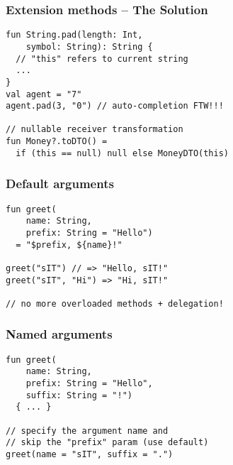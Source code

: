 \begin{frame}[fragile] \frametitle{Extension methods -- The Solution}
\begin{lstlisting}
fun String.pad(length: Int,
    symbol: String): String {
  // "this" refers to current string
  ...
}
val agent = "7"
agent.pad(3, "0") // auto-completion FTW!!!

// nullable receiver transformation
fun Money?.toDTO() =
  if (this == null) null else MoneyDTO(this)
\end{lstlisting}
\end{frame}



\begin{frame}[fragile] \frametitle{Default arguments}
\begin{lstlisting}
fun greet(
    name: String,
    prefix: String = "Hello")
  = "$prefix, ${name}!"

greet("sIT") // => "Hello, sIT!"
greet("sIT", "Hi") => "Hi, sIT!"

// no more overloaded methods + delegation!
\end{lstlisting}
\end{frame}


\begin{frame}[fragile] \frametitle{Named arguments}
\begin{lstlisting}
fun greet(
    name: String,
    prefix: String = "Hello",
    suffix: String = "!")
  { ... }

// specify the argument name and
// skip the "prefix" param (use default)
greet(name = "sIT", suffix = ".")
\end{lstlisting}
\end{frame}


